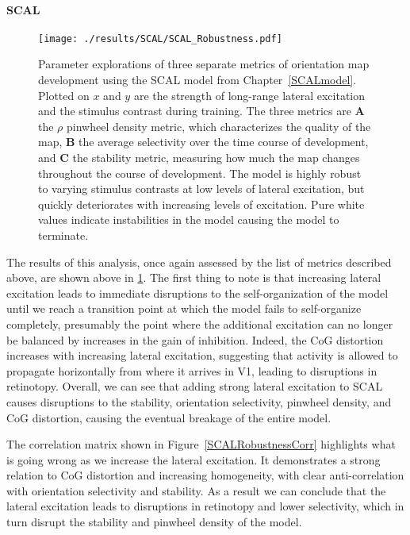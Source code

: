 \paragraph{SCAL}

\begin{figure}
	\centering
        \texttt{[image: ./results/SCAL/SCAL\_Robustness.pdf]}
	\caption{Parameter explorations of three separate metrics of
      orientation map development using the SCAL model from
      Chapter~\ref{SCALmodel}. Plotted on $x$ and $y$ are the strength
      of long-range lateral excitation and the stimulus contrast
      during training. The three metrics are \textbf{A} the $\rho$
      pinwheel density metric, which characterizes the quality of the
      map, \textbf{B} the average selectivity over the time course of
      development, and \textbf{C} the stability metric, measuring how
      much the map changes throughout the course of development. The
      model is highly robust to varying stimulus contrasts at low
      levels of lateral excitation, but quickly deteriorates with
      increasing levels of excitation. Pure white values indicate
      instabilities in the model causing the model to terminate.}
	\label{SCALStability}
\end{figure}

The results of this analysis, once again assessed by the list of
metrics described above, are shown above in \ref{SCALStability}. The
first thing to note is that increasing lateral excitation leads to
immediate disruptions to the self-organization of the model until we
reach a transition point at which the model fails to self-organize
completely, presumably the point where the additional excitation can
no longer be balanced by increases in the gain of inhibition. Indeed,
the CoG distortion increases with increasing lateral excitation,
suggesting that activity is allowed to propagate horizontally from
where it arrives in V1, leading to disruptions in retinotopy. Overall,
we can see that adding strong lateral excitation to SCAL causes
disruptions to the stability, orientation selectivity, pinwheel
density, and CoG distortion, causing the eventual breakage of the
entire model.

The correlation matrix shown in Figure~\ref{SCALRobustnessCorr}
highlights what is going wrong as we increase the lateral
excitation. It demonstrates a strong relation to CoG distortion and
increasing homogeneity, with clear anti-correlation with orientation
selectivity and stability. As a result we can conclude that the
lateral excitation leads to disruptions in retinotopy and lower
selectivity, which in turn disrupt the stability and pinwheel density
of the model.

